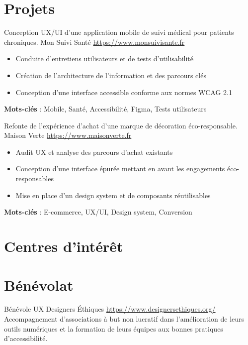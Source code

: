 \documentclass[a4paper, serif, 10pt]{moderncv}
\begin{document}
\section{Projets}

        {Conception UX/UI d'une application mobile de suivi médical pour patients chroniques.}
        {Mon Suivi Santé}
        {\url{https://www.monsuivisante.fr}}
        {}
        {\begin{itemize}
\item Conduite d'entretiens utilisateurs et de tests d'utilisabilité
\item Création de l'architecture de l'information et des parcours clés
\item Conception d'une interface accessible conforme aux normes WCAG 2.1
\end{itemize}
\textbf{Mots-clés} : Mobile, Santé, Accessibilité, Figma, Tests utilisateurs}

        {Refonte de l'expérience d'achat d'une marque de décoration éco-responsable.}
        {Maison Verte}
        {\url{https://www.maisonverte.fr}}
        {}
        {\begin{itemize}
\item Audit UX et analyse des parcours d'achat existants
\item Conception d'une interface épurée mettant en avant les engagements éco-responsables
\item Mise en place d'un design system et de composants réutilisables
\end{itemize}
\textbf{Mots-clés} : E-commerce, UX/UI, Design system, Conversion}
\section{Centres d'intérêt}

\section{Bénévolat}

        {Bénévole UX}
        {Designers Éthiques}
        {\url{https://www.designersethiques.org/}}
        {}
        {Accompagnement d'associations à but non lucratif dans l'amélioration de leurs outils numériques et la formation de leurs équipes aux bonnes pratiques d'accessibilité.}
\end{document}
